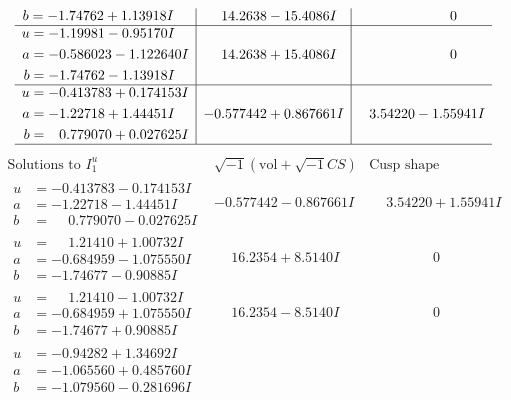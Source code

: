 \documentclass[1p]{elsarticle_modified}
\theoremstyle{definition}
\newcommand{\I}{\sqrt{-1}}
\begin{document}
$$\begin{array}{c|c|c}
\begin{aligned}
b &= -1.74762 + 1.13918 I\end{aligned}
 & \phantom{-}14.2638 - 15.4086 I & \phantom{-0.000000 } 0 \\ \hline\begin{aligned}
u &= -1.19981 - 0.95170 I \\
a &= -0.586023 - 1.122640 I \\
b &= -1.74762 - 1.13918 I\end{aligned}
 & \phantom{-}14.2638 + 15.4086 I & \phantom{-0.000000 } 0 \\ \hline\begin{aligned}
u &= -0.413783 + 0.174153 I \\
a &= -1.22718 + 1.44451 I \\
b &= \phantom{-}0.779070 + 0.027625 I\end{aligned}
 & -0.577442 + 0.867661 I & \phantom{-}3.54220 - 1.55941 I\\
 \hline 
 \end{array}$$\newpage$$\begin{array}{c|c|c}  
\text{Solutions to }I^u_{1}& \I (\text{vol} + \sqrt{-1}CS) & \text{Cusp shape}\\
 \hline 
\begin{aligned}
u &= -0.413783 - 0.174153 I \\
a &= -1.22718 - 1.44451 I \\
b &= \phantom{-}0.779070 - 0.027625 I\end{aligned}
 & -0.577442 - 0.867661 I & \phantom{-}3.54220 + 1.55941 I \\ \hline\begin{aligned}
u &= \phantom{-}1.21410 + 1.00732 I \\
a &= -0.684959 - 1.075550 I \\
b &= -1.74677 - 0.90885 I\end{aligned}
 & \phantom{-}16.2354 + 8.5140 I & \phantom{-0.000000 } 0 \\ \hline\begin{aligned}
u &= \phantom{-}1.21410 - 1.00732 I \\
a &= -0.684959 + 1.075550 I \\
b &= -1.74677 + 0.90885 I\end{aligned}
 & \phantom{-}16.2354 - 8.5140 I & \phantom{-0.000000 } 0 \\ \hline\begin{aligned}
u &= -0.94282 + 1.34692 I \\
a &= -1.065560 + 0.485760 I \\
b &= -1.079560 - 0.281696 I\end{aligned}

\end{array}$$
\end{document}
